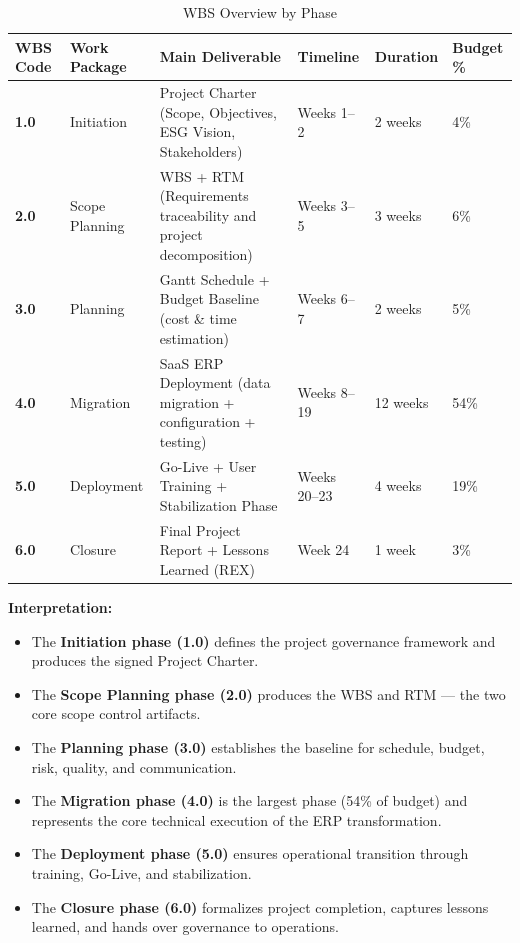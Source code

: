 \begin{table}[H]
\centering
\caption{WBS Overview by Phase}
\label{tab:wbs-overview}
\renewcommand{\arraystretch}{1.7}
\small
\begin{tabular}{|>{\bfseries}p{1.6cm}|p{3.0cm}|p{5.2cm}|p{1.8cm}|p{1.5cm}|p{1.2cm}|}
\hline
\rowcolor{tableheader}
\textbf{WBS Code} &
\textbf{Work Package} &
\textbf{Main Deliverable} &
\textbf{Timeline} &
\textbf{Duration} &
\textbf{Budget \%} \\
\hline
1.0 & Initiation & Project Charter (Scope, Objectives, ESG Vision, Stakeholders) & Weeks 1--2 & 2 weeks & 4\% \\
\hline
2.0 & Scope Planning & WBS + RTM (Requirements traceability and project decomposition) & Weeks 3--5 & 3 weeks & 6\% \\
\hline
3.0 & Planning & Gantt Schedule + Budget Baseline (cost \& time estimation) & Weeks 6--7 & 2 weeks & 5\% \\
\hline
4.0 & Migration & SaaS ERP Deployment (data migration + configuration + testing) & Weeks 8--19 & 12 weeks & 54\% \\
\hline
5.0 & Deployment & Go-Live + User Training + Stabilization Phase & Weeks 20--23 & 4 weeks & 19\% \\
\hline
6.0 & Closure & Final Project Report + Lessons Learned (REX) & Week 24 & 1 week & 3\% \\
\hline
\end{tabular}
\end{table}

\noindent\textbf{Interpretation:}
\begin{itemize}
    \item The \textbf{Initiation phase (1.0)} defines the project governance framework and produces the signed Project Charter.
    \item The \textbf{Scope Planning phase (2.0)} produces the WBS and RTM — the two core scope control artifacts.
    \item The \textbf{Planning phase (3.0)} establishes the baseline for schedule, budget, risk, quality, and communication.
    \item The \textbf{Migration phase (4.0)} is the largest phase (54\% of budget) and represents the core technical execution of the ERP transformation.
    \item The \textbf{Deployment phase (5.0)} ensures operational transition through training, Go-Live, and stabilization.
    \item The \textbf{Closure phase (6.0)} formalizes project completion, captures lessons learned, and hands over governance to operations.
\end{itemize}

